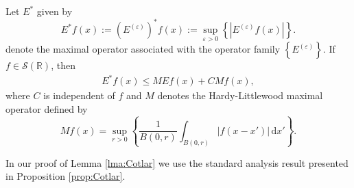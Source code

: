 \documentclass[../dissertation.tex]{subfiles}
\begin{document}





\begin{lma}
	\label{lma:Cotlar}
	Let $E^*$ given by
	\[
		E^*f(x)
				:= \left( E^{(\varepsilon)} \right)^* f(x)
				:= \sup_{\varepsilon>0} \left\{\left|E^{(\varepsilon)} f(x)\right|\right\}.
	\]
	denote the maximal operator associated with the operator family 
	$\left\{ E^{(\varepsilon)}\right\}$. If $f \in \mathscr S(\mathbb R)$, then 
	\begin{align} \label{eq:Cotlar}
		E^* f(x) \leq M E f(x) + C M f(x),
	\end{align}
	where $C$ is independent of $f$ and $M$\label{sym:hardy} denotes the 
	Hardy-Littlewood maximal operator
	defined by 
	\[
        M f(x) 
        	= \sup_{r > 0} 
        		\left\{ 
        			\frac{1}{B(0, r)} \int_{B(0, r)} |f(x - x')| \, \mathrm{d}x' 
        		\right\}.
    \]	
\end{lma}



In our proof of Lemma \ref{lma:Cotlar} we use the standard analysis result 
presented in Proposition \ref{prop:Cotlar}.
\end{document}
